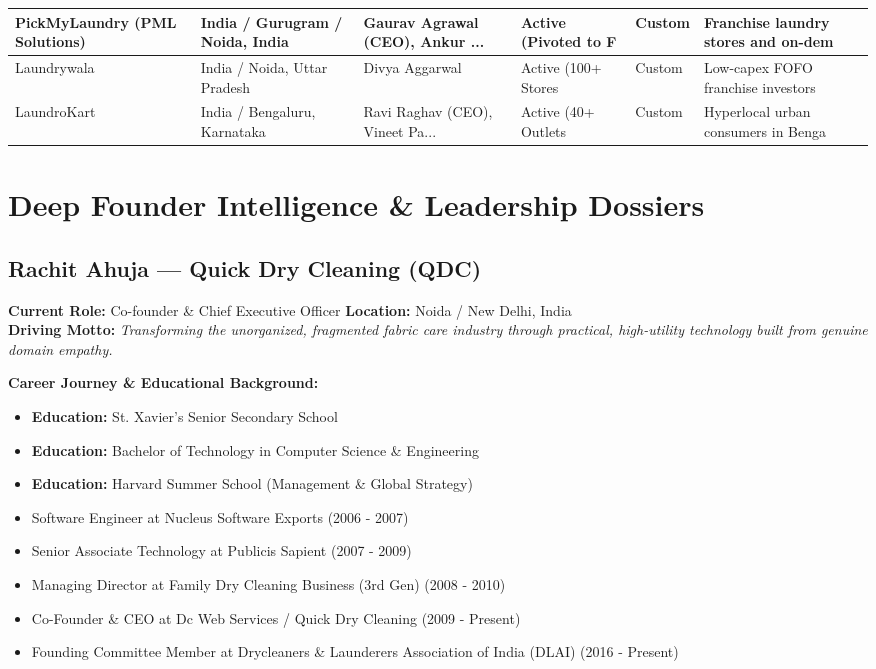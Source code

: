 \documentclass[11pt,a4paper]{article}
\begin{document}
\begin{longtable}{p{3.2cm} p{2.2cm} p{2.5cm} p{2.2cm} p{1.8cm} p{2.5cm}}
\midrule
PickMyLaundry (PML Solutions) & India / Gurugram / Noida, India & Gaurav Agrawal (CEO), Ankur ... & Active (Pivoted to F & Custom & Franchise laundry stores and on-dem \\
\midrule
Laundrywala & India / Noida, Uttar Pradesh & Divya Aggarwal & Active (100+ Stores  & Custom & Low-capex FOFO franchise investors  \\
\midrule
LaundroKart & India / Bengaluru, Karnataka & Ravi Raghav (CEO), Vineet Pa... & Active (40+ Outlets  & Custom & Hyperlocal urban consumers in Benga \\
\midrule
\bottomrule
\end{longtable}

\newpage
\section{Deep Founder Intelligence \& Leadership Dossiers}
\subsection{Rachit Ahuja --- Quick Dry Cleaning (QDC)}
\textbf{Current Role:} Co-founder \& Chief Executive Officer \quad \textbf{Location:} Noida / New Delhi, India\\
\textbf{Driving Motto:} \textit{Transforming the unorganized, fragmented fabric care industry through practical, high-utility technology built from genuine domain empathy.}

\textbf{Career Journey \& Educational Background:}
\begin{itemize}[leftmargin=*]
    \item \textbf{Education:} St. Xavier's Senior Secondary School
    \item \textbf{Education:} Bachelor of Technology in Computer Science \& Engineering
    \item \textbf{Education:} Harvard Summer School (Management \& Global Strategy)
    \item Software Engineer at Nucleus Software Exports (2006 - 2007)
    \item Senior Associate Technology at Publicis Sapient (2007 - 2009)
    \item Managing Director at Family Dry Cleaning Business (3rd Gen) (2008 - 2010)
    \item Co-Founder \& CEO at Dc Web Services / Quick Dry Cleaning (2009 - Present)
    \item Founding Committee Member at Drycleaners \& Launderers Association of India (DLAI) (2016 - Present)
\end{itemize}
\end{document}
